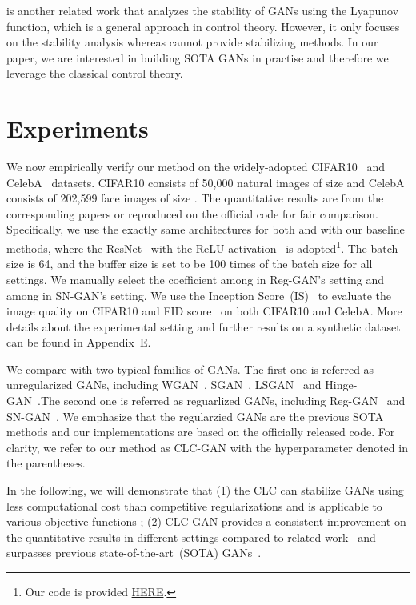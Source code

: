 \documentclass{article}
\theoremstyle{definition}
\begin{document}
\citet{feizi2017understanding} is another related work that analyzes the stability of GANs using the Lyapunov function, which is a general approach in control theory. However, it only focuses on the stability analysis whereas cannot provide stabilizing methods. In our paper, we are interested in building SOTA GANs in practise and therefore we leverage the classical control theory.





\section{Experiments}\label{sec:experiment}


We now empirically verify our method on the widely-adopted CIFAR10~\citep{krizhevsky2009learning} and CelebA~\citep{liu2015faceattributes} datasets. 
CIFAR10 consists of 50,000 natural images of size  and CelebA consists of 202,599 face images of size .
The quantitative results are from the corresponding papers or reproduced on the official code for fair comparison.
Specifically, we use the exactly same architectures for both  and  with our baseline methods, where the ResNet~\citep{he2016deep} with the ReLU activation~\citep{glorot2011deep} is adopted\footnote{Our code is provided \href{https://github.com/taufikxu/GAN_PID}{HERE}.}.
The batch size is 64, and the buffer size  is set to be 100 times of the batch size for all settings. 
We manually select the coefficient  among  in Reg-GAN's setting and among  in SN-GAN's setting.
We use the Inception Score~(IS)~\citep{salimans2016improved} to evaluate the image quality on CIFAR10 and FID score~\citep{gulrajani2017improved} on both CIFAR10 and CelebA. 
More details about the experimental setting and further results on a synthetic dataset can be found in Appendix~E. 


We compare with two typical families of GANs. The first one is referred as unregularized GANs, including WGAN~\cite{arjovsky2017wasserstein}, SGAN~\cite{goodfellow2014generative}, LSGAN~\cite{mao2017least} and Hinge-GAN~\cite{miyato2018spectral}.The second one is referred as reguarlized GANs, including Reg-GAN~\cite{mescheder2018training} and SN-GAN~\cite{miyato2018spectral}.
We emphasize that the regularzied GANs are the previous SOTA methods and our implementations are based on the officially released code. 
For clarity, we refer to our method as CLC-GAN with the hyperparameter  denoted in the parentheses.

In the following, we will demonstrate that (1) the CLC can stabilize GANs using less computational cost than competitive regularizations and is applicable to various objective functions ; (2) CLC-GAN provides a consistent improvement on the quantitative results in different settings compared to related work~\cite{mescheder2018training} and surpasses previous state-of-the-art~(SOTA) GANs~\cite{miyato2018spectral,zhang2019consistency}.
\end{document}
